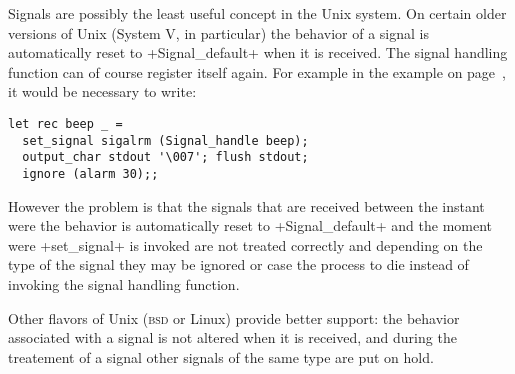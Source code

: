 Signals are possibly the least useful concept in the Unix system.  On
certain older versions of Unix (System V, in particular) the behavior
of a signal is automatically reset to \ml+Signal_default+ when it is
received. The signal handling function can of course register itself
again. For example in the  example on
page~\pageref{ex/beep}, it would be necessary to write:
%
\begin{lstlisting}
let rec beep _ =
  set_signal sigalrm (Signal_handle beep);
  output_char stdout '\007'; flush stdout;
  ignore (alarm 30);;
\end{lstlisting}
%
However the problem is that the signals that are received between the
instant were the behavior is automatically reset to
\ml+Signal_default+ and the moment were \ml+set_signal+ is invoked are
not treated correctly and depending on the type of the signal they may
be ignored or case the process to die instead of invoking the signal
handling function. 

Other flavors of Unix (\textsc{bsd} or Linux) provide better support:
the behavior associated with a signal is not altered when it is
received, and during the treatement of a signal other signals of the
same type are put on hold.


